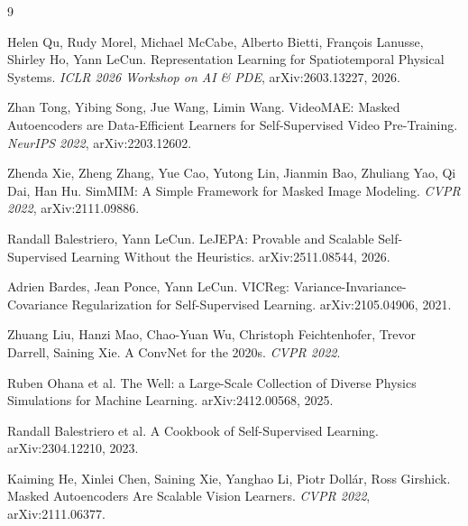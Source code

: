 \documentclass{article}
\begin{document}
\begin{thebibliography}{9}

Helen Qu, Rudy Morel, Michael McCabe, Alberto Bietti, Fran\c{c}ois Lanusse,
Shirley Ho, Yann LeCun.
\newblock Representation Learning for Spatiotemporal Physical Systems.
\newblock \emph{ICLR 2026 Workshop on AI \& PDE}, arXiv:2603.13227, 2026.

Zhan Tong, Yibing Song, Jue Wang, Limin Wang.
\newblock VideoMAE: Masked Autoencoders are Data-Efficient Learners for
Self-Supervised Video Pre-Training.
\newblock \emph{NeurIPS 2022}, arXiv:2203.12602.

Zhenda Xie, Zheng Zhang, Yue Cao, Yutong Lin, Jianmin Bao, Zhuliang Yao,
Qi Dai, Han Hu.
\newblock SimMIM: A Simple Framework for Masked Image Modeling.
\newblock \emph{CVPR 2022}, arXiv:2111.09886.

Randall Balestriero, Yann LeCun.
\newblock LeJEPA: Provable and Scalable Self-Supervised Learning Without the
Heuristics.
\newblock arXiv:2511.08544, 2026.

Adrien Bardes, Jean Ponce, Yann LeCun.
\newblock VICReg: Variance-Invariance-Covariance Regularization for
Self-Supervised Learning.
\newblock arXiv:2105.04906, 2021.

Zhuang Liu, Hanzi Mao, Chao-Yuan Wu, Christoph Feichtenhofer, Trevor Darrell,
Saining Xie.
\newblock A ConvNet for the 2020s.
\newblock \emph{CVPR 2022}.

Ruben Ohana et al.
\newblock The Well: a Large-Scale Collection of Diverse Physics Simulations
for Machine Learning.
\newblock arXiv:2412.00568, 2025.

Randall Balestriero et al.
\newblock A Cookbook of Self-Supervised Learning.
\newblock arXiv:2304.12210, 2023.

Kaiming He, Xinlei Chen, Saining Xie, Yanghao Li, Piotr Doll\'ar, Ross Girshick.
\newblock Masked Autoencoders Are Scalable Vision Learners.
\newblock \emph{CVPR 2022}, arXiv:2111.06377.

\end{thebibliography}
\end{document}
